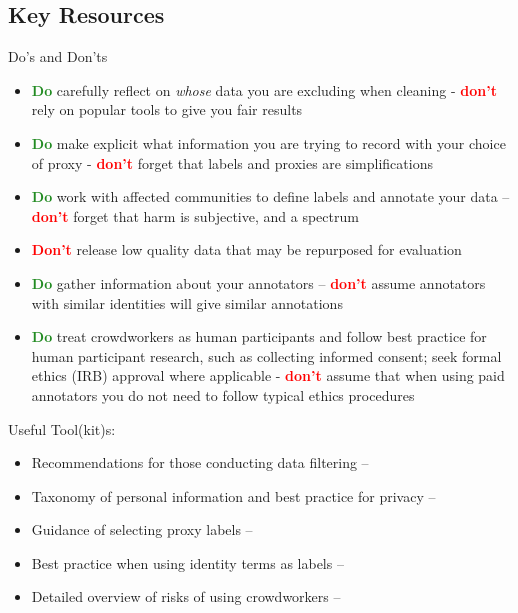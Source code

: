 \subsection{Key Resources}
Do's and Don'ts
\begin{itemize}
    \item \textcolor{ForestGreen}{\textbf{Do}} carefully reflect on \textit{whose} data you are excluding when cleaning - \textcolor{red}{\textbf{don't}} rely on popular tools to give you fair results
    \item \textcolor{ForestGreen}{\textbf{Do}} make explicit what information you are trying to record with your choice of proxy - \textcolor{red}{\textbf{don't}} forget that labels and proxies are simplifications  
    \item \textcolor{ForestGreen}{\textbf{Do}} work with affected communities to define labels and annotate your data -- \textcolor{red}{\textbf{don't}} forget that harm is subjective, and a spectrum 
    \item  \textcolor{red}{\textbf{Don't}} release low quality data that may be repurposed for evaluation
    \item \textcolor{ForestGreen}{\textbf{Do}} gather information about your annotators -- \textcolor{red}{\textbf{don't}} assume annotators with similar identities will give similar annotations
    \item \textcolor{ForestGreen}{\textbf{Do}} treat crowdworkers as human participants and follow best practice for human participant research, such as collecting informed consent; seek formal ethics (IRB) approval where applicable - \textcolor{red}{\textbf{don't}} assume that when using paid annotators you do not need to follow typical ethics procedures
\end{itemize}

\noindent Useful Tool(kit)s: 
\begin{itemize}
    \item Recommendations for those conducting data filtering -- \citet{hong_whos_2024}
    \item Taxonomy of personal information and best practice for privacy -- \citet{subramani_detecting_2023}
    \item Guidance of selecting proxy labels -- \citet{guerdan_groundless_2023}
    \item Best practice when using identity terms as labels -- \citet{larson_gender_2017}
    \item Detailed overview of risks of using crowdworkers -- \citet{shmueli_beyond_2021}
\end{itemize}
